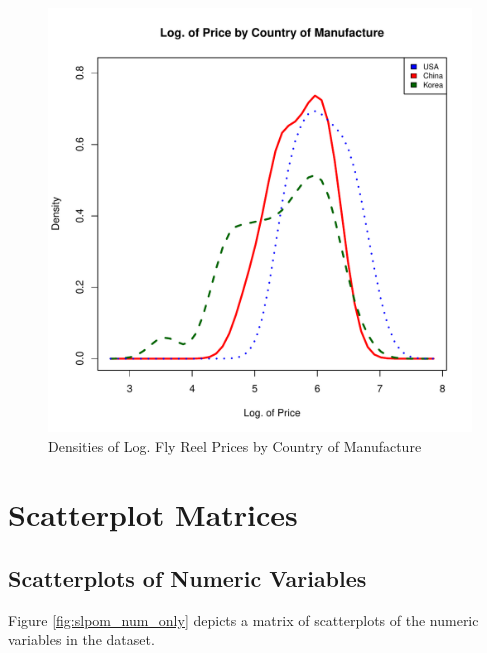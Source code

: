 \begin{figure}[h!]
  \centering
  \includegraphics[scale = 0.5, keepaspectratio=true]{../Figures/dens_by_country}
  \caption{Densities of Log. Fly Reel Prices by Country of Manufacture} \label{fig:dens_by_country}
\end{figure}


\clearpage
\pagebreak
\section{Scatterplot Matrices}


\subsection{Scatterplots of Numeric Variables}

Figure \ref{fig:slpom_num_only} depicts a matrix of scatterplots
of the numeric variables in the dataset.

